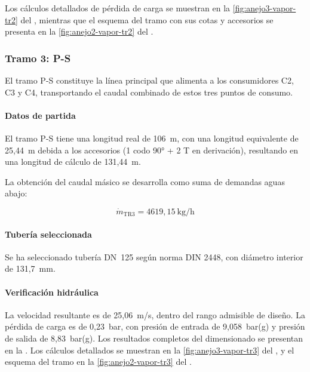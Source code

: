\documentclass[12pt]{article}
\begin{document}
Los cálculos detallados de pérdida de carga se muestran en la \autoref{fig:anejo3-vapor-tr2} del , mientras que el esquema del tramo con sus cotas y accesorios se presenta en la \autoref{fig:anejo2-vapor-tr2} del .

\subsubsection{Tramo 3: P-S}
\label{subsubsec:tramo3-p-s}

El tramo P-S constituye la línea principal que alimenta a los consumidores C2, C3 y C4, transportando el caudal combinado de estos tres puntos de consumo.

\paragraph{Datos de partida}

El tramo P-S tiene una longitud real de 106~m, con una longitud equivalente de 25,44~m debida a los accesorios (1 codo 90° + 2 T en derivación), resultando en una longitud de cálculo de 131,44~m.

La obtenci\'on del caudal m\'asico se desarrolla como suma de demandas aguas abajo:

\begin{equation}
	\dot{m}_{\text{TR3}} = 4619{,}15~\text{kg/h}
	\label{eq:caudal-tramo3}
\end{equation}

\paragraph{Tubería seleccionada}

Se ha seleccionado tubería DN~125 según norma DIN 2448, con diámetro interior de 131,7~mm.

\paragraph{Verificación hidráulica}

La velocidad resultante es de 25,06~m/s, dentro del rango admisible de diseño. La pérdida de carga es de 0,23~bar, con presión de entrada de 9,058~bar(g) y presión de salida de 8,83~bar(g). Los resultados completos del dimensionado se presentan en la . Los cálculos detallados se muestran en la \autoref{fig:anejo3-vapor-tr3} del , y el esquema del tramo en la \autoref{fig:anejo2-vapor-tr3} del .
\end{document}

